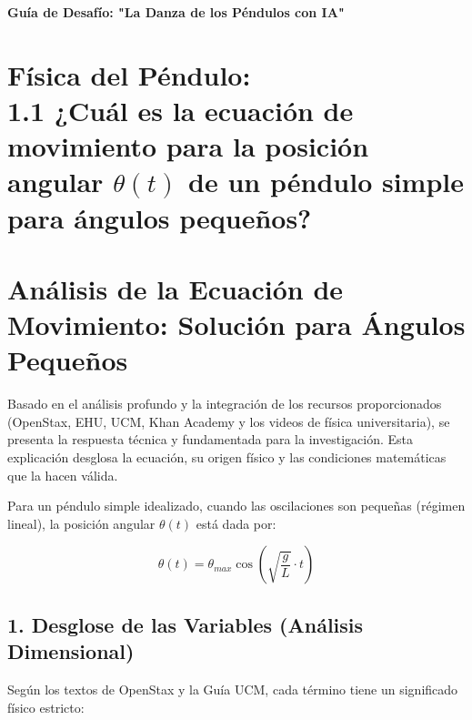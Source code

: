 \documentclass[12pt, a4paper]{article}
\begin{document}
	

	
	
	\begin{center}
		\LARGE \textbf{Guía de Desafío: "La Danza de los Péndulos con IA"}
	\end{center}
	\vspace{0.1cm}
	
	\section*{Física del Péndulo: \\  1.1 ¿Cuál es la ecuación de movimiento para la posición angular $\theta(t)$ de un péndulo simple para ángulos pequeños?}
	
	
	
	\vspace{0.2cm}
	
	
	\section{Análisis de la Ecuación de Movimiento: Solución para Ángulos Pequeños}
	
	Basado en el análisis profundo y la integración de los recursos proporcionados (OpenStax, EHU, UCM, Khan Academy y los videos de física universitaria), se presenta la respuesta técnica y fundamentada para la investigación. Esta explicación desglosa la ecuación, su origen físico y las condiciones matemáticas que la hacen válida.
	
	Para un péndulo simple idealizado, cuando las oscilaciones son pequeñas (régimen lineal), la posición angular $\theta(t)$ está dada por:
	
	\begin{equation}
		\theta(t) = \theta_{max} \cos\left(\sqrt{\frac{g}{L}} \cdot t\right)
		\label{eq:movimiento_pendulo}
	\end{equation}
	
	\subsection{1. Desglose de las Variables (Análisis Dimensional)}
	Según los textos de OpenStax y la Guía UCM, cada término tiene un significado físico estricto:
	
\end{document}
